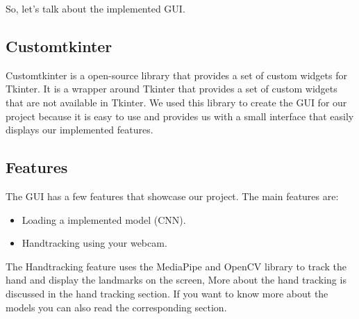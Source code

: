 \documentclass[../paper.tex]{subfiles}
\begin{document}
    So, let's talk about the implemented GUI.\\
    \subsection{Customtkinter}
    Customtkinter is a open-source library that provides a set of custom widgets for Tkinter. 
    It is a wrapper around Tkinter that provides a set of custom widgets that are not available in Tkinter.
    We used this library to create the GUI for our project because it is easy to use and provides us with a small interface that 
    easily displays our implemented features.
    \subsection{Features}
    The GUI has a few features that showcase our project. The main features are:
    \begin{itemize}
        \item Loading a implemented model (CNN).
        \item Handtracking using your webcam.
    \end{itemize}
    The Handtracking feature uses the MediaPipe and OpenCV library to track the hand and display the landmarks on the screen,
    More about the hand tracking is discussed in the hand tracking section. If you want to know more about the models you can 
    also read the corresponding section.
\end{document}
